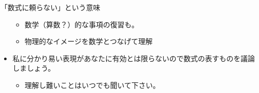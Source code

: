 \begin{frame}
\begin{block}{「数式に頼らない」という意味}
\begin{itemize}
  \begin{itemize}
  
  \item
    数学（算数？）的な事項の復習も。
  \item
    物理的なイメージを数学とつなげて理解
  \end{itemize}
\item
  私に分かり易い表現があなたに有効とは限らないので数式の表すものを議論しましょう。

  \begin{itemize}
  
  \item
    {理解し難いことはいつでも聞いて下さい。}
  \end{itemize}
\end{itemize}

\end{block}

\end{frame}

